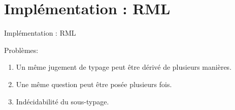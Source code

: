 \documentclass{beamer}
\begin{document}
\section{Implémentation : RML}

\begin{frame}
	\begin{center}
		\Huge{Implémentation : RML}
	\end{center}
\end{frame}

\begin{frame}
  Problèmes:
  \begin{enumerate}
  \item Un même jugement de typage peut être dérivé de plusieurs manières.
  \item Une même question peut être posée plusieurs fois.
  \item Indécidabilité du sous-typage.
  \end{enumerate}
\end{frame}

%
%
%
%
%
\end{document}
